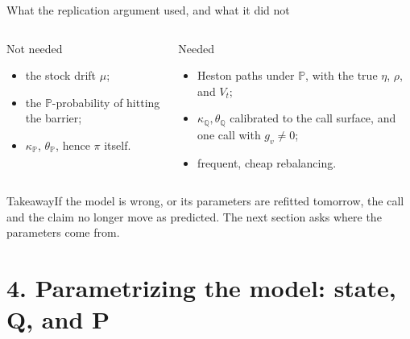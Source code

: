 \documentclass[handout,10pt,t,aspectratio=169]{beamer}
\newenvironment{keybox}{\begin{exampleblock}{Takeaway}}{\end{exampleblock}}
\newcommand{\Q}{\mathbb Q}
\newcommand{\Pp}{\mathbb P}
\begin{document}
\begin{frame}{What the replication argument used, and what it did not}
\small
\begin{columns}[T,onlytextwidth]
\begin{exampleblock}{Not needed}
\begin{itemize}
\item the stock drift \(\mu\);
\item the \(\Pp\)-probability of hitting the barrier;
\item \(\kappa_\Pp\), \(\theta_\Pp\), hence \(\pi\) itself.
\end{itemize}
\end{exampleblock}
\begin{alertblock}{Needed}
\begin{itemize}
\item Heston paths under \(\Pp\), with the true \(\eta\), \(\rho\), and \(V_t\);
\item \(\kappa_\Q,\theta_\Q\) calibrated to the call surface, and one call with \(g_v\ne0\);
\item frequent, cheap rebalancing.
\end{itemize}
\end{alertblock}
\end{columns}
\begin{keybox}If the model is wrong, or its parameters are refitted tomorrow, the call and
the claim no longer move as predicted. The next section asks where the parameters come from.\end{keybox}
\end{frame}

\section{4. Parametrizing the model: state, Q, and P}
\end{document}
